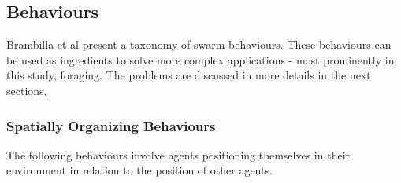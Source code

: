 \subsection{Behaviours}
\label{swarmrobotapplications}

Brambilla et al \cite{brambilla2013swarm} present a taxonomy of swarm behaviours. These behaviours can be used as ingredients to solve more complex applications - most prominently in this study, foraging. The problems are discussed in more details in the next sections.

\subsubsection{Spatially Organizing Behaviours}
The following behaviours involve agents positioning themselves in their environment in relation to the position of other agents.

